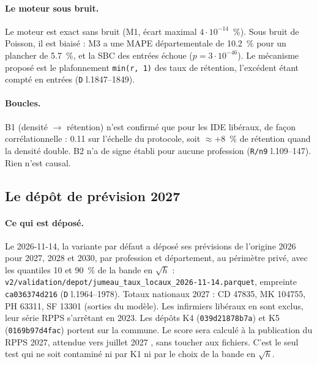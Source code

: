 \paragraph{Le moteur sous bruit.} Le moteur est exact sans bruit (M1, écart maximal
$4\cdot10^{-14}$\mesure{}~\%). Sous bruit de Poisson, il est biaisé : M3 a une MAPE départementale
de \num{10.2}\mesure{}~\% pour un plancher de \num{5.7}\derive{}~\%, et la SBC des entrées échoue
($p = 3\cdot10^{-46}$\mesure). Le mécanisme proposé est le plafonnement \texttt{min(r, 1)} des taux
de rétention, l'excédent étant compté en entrées (\texttt{D} l.1847--1849).

\paragraph{Boucles.} B1 (densité $\to$ rétention) n'est confirmé que pour les IDE libéraux, de façon
corrélationnelle : \num{+0.11}\mesure{} sur l'échelle du protocole, soit $\approx +8$\derive{}~\% de
rétention quand la densité double. B2 n'a de signe établi pour aucune profession
(\texttt{R/n9} l.109--147). Rien n'est causal.

\subsection{Le dépôt de prévision 2027}\label{val:depot}

\paragraph{Ce qui est déposé.} Le 2026-11-14, la variante par défaut a déposé ses prévisions de
l'origine 2026 pour 2027, 2028 et 2030, par profession et département, au périmètre privé, avec
les quantiles 10 et 90~\% de la bande en $\sqrt h$ :
\texttt{v2/\allowbreak validation/\allowbreak depot/\allowbreak jumeau\_taux\_locaux\_2026-11-14.parquet}, empreinte
\texttt{ca036374d216} (\texttt{D} l.1964--1978). Totaux nationaux 2027 : CD
\num{47835}\mesure, MK \num{104755}\mesure, PH \num{63311}\mesure, SF \num{13301}\mesure{} (sorties
du modèle). Les infirmiers libéraux en sont exclus, leur série RPPS s'arrêtant en 2023. Les
dépôts K4 (\texttt{039d21878b7a}) et K5 (\texttt{0169b97d4fac}) portent sur la commune. Le score
sera calculé à la publication du RPPS 2027, attendue vers juillet 2027 \citep{drees2026demo}, sans
toucher aux fichiers. C'est le seul test qui ne soit contaminé ni par K1 ni par le choix de la
bande en $\sqrt h$.

